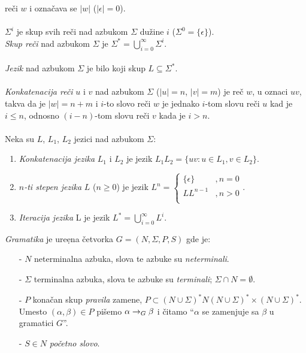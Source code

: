       re\v ci $w$ i ozna\v cava se $|w|$ ($|\epsilon|=0$).\\
      \\
      $\Sigma^{i}$ je skup svih re\v ci nad azbukom $\Sigma$ du\v zine
      $i$ ($\Sigma^{0}=\{\epsilon\}$).\\
      {\em Skup re\v ci} nad azbukom $\Sigma$ je
      $\Sigma^{*}=\bigcup^{\infty}_{i=0}\Sigma^{i}$.\\
      \\
      {\em Jezik} nad azbukom $\Sigma$ je bilo koji skup
      $L\subseteq\Sigma^{*}$.\\
      \\
      {\em Konkatenacija re\v ci} $u$ i $v$ nad azbukom $\Sigma$ ($|u|=n$,
      $|v|=m$) je re\v c $w$, u oznaci $uv$, takva da je $|w|=n+m$ i $i$-to
      slovo re\v ci $w$ je jednako $i$-tom slovu re\v ci $u$ kad je
      $i\leq n$, odnosno $(i-n)$-tom slovu re\v ci $v$ kada je $i>n$.\\
      \\
      Neka su $L$, $L_{1}$, $L_{2}$ jezici nad azbukom $\Sigma$:
      \begin{enumerate}
        \item
        {
          {\em Konkatenacija jezika} $L_{1}$ i $L_{2}$ je jezik
          $L_{1}L_{2}=\{uv:u\in L_{1}, v\in L_{2}\}$.
        }
        \item
        {
          {\em $n$-ti stepen jezika} $L$ ($n\ge 0$) je jezik
          $
            L^{n}=
            \left\{
            \begin{array}{ll}
              \{\epsilon\}&,n=0\\
              LL^{n-1}    &,n>0\\
            \end{array}
            \right.
          $.
        }
        \item
        {
          {\em Iteracija jezika} L je jezik
          $L^{*}=\bigcup^{\infty}_{i=0}L^{i}$.
        }
      \end{enumerate}
      {\em Gramatika} je ure\d ena \v cetvorka $G=(N,\Sigma,P,S)$ gde je:
      \begin{itemize}
        \item[-]
        {
          $N$ neterminalna azbuka, slova te azbuke su {\em neterminali}.
        }
        \item[-]
        {
          $\Sigma$ terminalna azbuka, slova te azbuke su {\em terminali};
          $\Sigma\cap N=\emptyset$.
        }
        \item[-]
        {
          $P$ kona\v can skup {\em pravila} zamene,
          $P\subset(N\cup\Sigma)^{*}N(N\cup\Sigma)^{*}\times(N\cup\Sigma)^{*}$.
          Umesto $(\alpha,\beta)\in P$ pi\v semo $\alpha\rightarrow_{G}\beta$ i
          \v citamo ``$\alpha$ se zamenjuje sa $\beta$ u gramatici $G$''.\\
        }
        \item[-]
        {
          $S\in N$ {\em po\v cetno slovo}.
        }
      \end{itemize}

